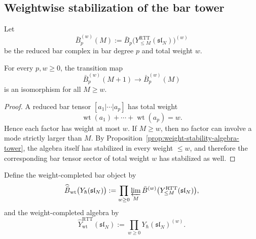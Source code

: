 \subsection{Weightwise stabilization of the bar tower}

Let
\begin{equation}
\bar B_p^{(w)}(M):=
\bar B_p\big(Y^{\mathrm{RTT}}_{\le M}(\mathfrak{sl}_N)\big)^{(w)}
\end{equation}
be the reduced bar complex in bar degree $p$ and total weight $w$.

\begin{lemma}
\ClaimStatusProvedHere
\label{lem:weight-stability-bar-tower}
For every $p,w\ge 0$, the transition map
\begin{equation}
\bar B_p^{(w)}(M+1)\longrightarrow \bar B_p^{(w)}(M)
\end{equation}
is an isomorphism for all $M\ge w$.
\end{lemma}

\begin{proof}
A reduced bar tensor $[a_1|\cdots|a_p]$ has total weight
\begin{equation}
\operatorname{wt}(a_1)+\cdots+\operatorname{wt}(a_p)=w.
\end{equation}
Hence each factor has weight at most $w$.  If $M\ge w$, then no factor can
involve a mode strictly larger than $M$.  By
Proposition~\ref{prop:weight-stability-algebra-tower}, the algebra itself
has stabilized in every weight $\le w$, and therefore the corresponding
bar tensor sector of total weight $w$ has stabilized as well.
\end{proof}

Define the weight-completed bar object by
\begin{equation}
\widehat{\bar B}_{\mathrm{wt}}\big(Y_\hbar(\mathfrak{sl}_N)\big)
:=
\prod_{w\ge 0}\varprojlim_M \bar B^{(w)}\big(Y^{\mathrm{RTT}}_{\le M}(\mathfrak{sl}_N)\big),
\end{equation}
and the weight-completed algebra by
\begin{equation}
\widehat Y^{\mathrm{RTT}}_{\mathrm{wt}}(\mathfrak{sl}_N)
:=
\prod_{w\ge 0}Y_\hbar(\mathfrak{sl}_N)^{(w)}.
\end{equation}

